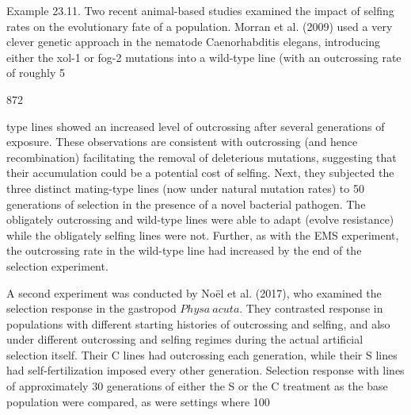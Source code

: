 \documentclass{article}
\begin{document}
Example 23.11. Two recent animal-based studies examined the impact of selfing rates on the evolutionary fate of a population. Morran et al. (2009) used a very clever genetic approach in the nematode Caenorhabditis elegans, introducing either the xol-1 or fog-2 mutations into a wild-type line (with an outcrossing rate of roughly 5%

872

type lines showed an increased level of outcrossing after several generations of exposure. These observations are consistent with outcrossing (and hence recombination) facilitating the removal of deleterious mutations, suggesting that their accumulation could be a potential cost of selfing. Next, they subjected the three distinct mating-type lines (now under natural mutation rates) to 50 generations of selection in the presence of a novel bacterial pathogen. The obligately outcrossing and wild-type lines were able to adapt (evolve resistance) while the obligately selfing lines were not. Further, as with the EMS experiment, the outcrossing rate in the wild-type line had increased by the end of the selection experiment.

A second experiment was conducted by Noël et al. (2017), who examined the selection response in the gastropod  $ Physa\ acuta $. They contrasted response in populations with different starting histories of outcrossing and selfing, and also under different outcrossing and selfing regimes during the actual artificial selection itself. Their C lines had outcrossing each generation, while their S lines had self-fertilization imposed every other generation. Selection response with lines of approximately 30 generations of either the S or the C treatment as the base population were compared, as were settings where 100%
\end{document}
